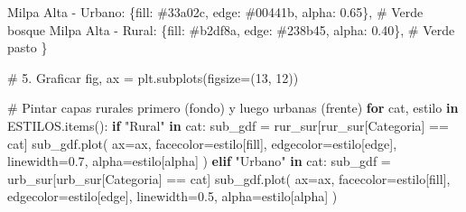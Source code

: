 \documentclass[
  spanish,
  letterpaper,
  DIV=11,
  numbers=noendperiod]{scrartcl}
\newenvironment{Shaded}{\begin{snugshade}}{\end{snugshade}}
\newcommand{\CommentTok}[1]{\textcolor[rgb]{0.37,0.37,0.37}{#1}}
\newcommand{\ControlFlowTok}[1]{\textcolor[rgb]{0.00,0.23,0.31}{\textbf{#1}}}
\newcommand{\DecValTok}[1]{\textcolor[rgb]{0.68,0.00,0.00}{#1}}
\newcommand{\FloatTok}[1]{\textcolor[rgb]{0.68,0.00,0.00}{#1}}
\newcommand{\KeywordTok}[1]{\textcolor[rgb]{0.00,0.23,0.31}{\textbf{#1}}}
\newcommand{\NormalTok}[1]{\textcolor[rgb]{0.00,0.23,0.31}{#1}}
\newcommand{\OperatorTok}[1]{\textcolor[rgb]{0.37,0.37,0.37}{#1}}
\newcommand{\StringTok}[1]{\textcolor[rgb]{0.13,0.47,0.30}{#1}}
\begin{document}
\begin{Shaded}
\begin{Highlighting}[]
    \StringTok{\textquotesingle{}Milpa Alta {-} Urbano\textquotesingle{}}\NormalTok{:    \{}\StringTok{\textquotesingle{}fill\textquotesingle{}}\NormalTok{: }\StringTok{\textquotesingle{}\#33a02c\textquotesingle{}}\NormalTok{, }\StringTok{\textquotesingle{}edge\textquotesingle{}}\NormalTok{: }\StringTok{\textquotesingle{}\#00441b\textquotesingle{}}\NormalTok{, }\StringTok{\textquotesingle{}alpha\textquotesingle{}}\NormalTok{: }\FloatTok{0.65}\NormalTok{\},  }\CommentTok{\# Verde bosque}
    \StringTok{\textquotesingle{}Milpa Alta {-} Rural\textquotesingle{}}\NormalTok{:     \{}\StringTok{\textquotesingle{}fill\textquotesingle{}}\NormalTok{: }\StringTok{\textquotesingle{}\#b2df8a\textquotesingle{}}\NormalTok{, }\StringTok{\textquotesingle{}edge\textquotesingle{}}\NormalTok{: }\StringTok{\textquotesingle{}\#238b45\textquotesingle{}}\NormalTok{, }\StringTok{\textquotesingle{}alpha\textquotesingle{}}\NormalTok{: }\FloatTok{0.40}\NormalTok{\},  }\CommentTok{\# Verde pasto}
\NormalTok{\}}

\CommentTok{\# 5. Graficar}
\NormalTok{fig, ax }\OperatorTok{=}\NormalTok{ plt.subplots(figsize}\OperatorTok{=}\NormalTok{(}\DecValTok{13}\NormalTok{, }\DecValTok{12}\NormalTok{))}

\CommentTok{\# Pintar capas rurales primero (fondo) y luego urbanas (frente)}
\ControlFlowTok{for}\NormalTok{ cat, estilo }\KeywordTok{in}\NormalTok{ ESTILOS.items():}
    \ControlFlowTok{if} \StringTok{"Rural"} \KeywordTok{in}\NormalTok{ cat:}
\NormalTok{        sub\_gdf }\OperatorTok{=}\NormalTok{ rur\_sur[rur\_sur[}\StringTok{\textquotesingle{}Categoria\textquotesingle{}}\NormalTok{] }\OperatorTok{==}\NormalTok{ cat]}
\NormalTok{        sub\_gdf.plot(}
\NormalTok{            ax}\OperatorTok{=}\NormalTok{ax,}
\NormalTok{            facecolor}\OperatorTok{=}\NormalTok{estilo[}\StringTok{\textquotesingle{}fill\textquotesingle{}}\NormalTok{],}
\NormalTok{            edgecolor}\OperatorTok{=}\NormalTok{estilo[}\StringTok{\textquotesingle{}edge\textquotesingle{}}\NormalTok{],}
\NormalTok{            linewidth}\OperatorTok{=}\FloatTok{0.7}\NormalTok{,}
\NormalTok{            alpha}\OperatorTok{=}\NormalTok{estilo[}\StringTok{\textquotesingle{}alpha\textquotesingle{}}\NormalTok{]}
\NormalTok{        )}
    \ControlFlowTok{elif} \StringTok{"Urbano"} \KeywordTok{in}\NormalTok{ cat:}
\NormalTok{        sub\_gdf }\OperatorTok{=}\NormalTok{ urb\_sur[urb\_sur[}\StringTok{\textquotesingle{}Categoria\textquotesingle{}}\NormalTok{] }\OperatorTok{==}\NormalTok{ cat]}
\NormalTok{        sub\_gdf.plot(}
\NormalTok{            ax}\OperatorTok{=}\NormalTok{ax,}
\NormalTok{            facecolor}\OperatorTok{=}\NormalTok{estilo[}\StringTok{\textquotesingle{}fill\textquotesingle{}}\NormalTok{],}
\NormalTok{            edgecolor}\OperatorTok{=}\NormalTok{estilo[}\StringTok{\textquotesingle{}edge\textquotesingle{}}\NormalTok{],}
\NormalTok{            linewidth}\OperatorTok{=}\FloatTok{0.5}\NormalTok{,}
\NormalTok{            alpha}\OperatorTok{=}\NormalTok{estilo[}\StringTok{\textquotesingle{}alpha\textquotesingle{}}\NormalTok{]}
\NormalTok{        )}


\end{Highlighting}
\end{Shaded}
\end{document}
